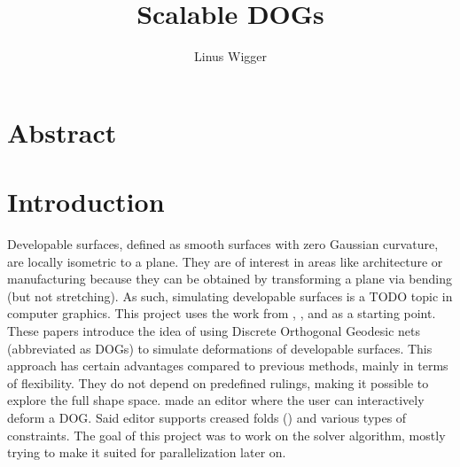 \documentclass[a4paper,twoside,12pt,nochapterprefix]{scrbook}
\title{Scalable DOGs}
\author{Linus Wigger}
\begin{document}
\maketitle

\chapter{Abstract}\label{sec:abstract}
\chapter{Introduction}\label{sec:intro}\label{sec:prev_work}
Developable surfaces, defined as smooth surfaces with zero Gaussian curvature, are locally isometric to a plane. They are of interest in areas like architecture or manufacturing because they can be obtained by transforming a plane via bending (but not stretching). As such, simulating developable surfaces is a TODO topic in computer graphics.\newline
This project uses the work from \cite{Rabinovich:DogNets:2018}, \cite{Rabinovich:DogShapeSpace:2018}, and \cite{Rabinovich:CurvedFolds:2019} as a starting point. These papers introduce the idea of using Discrete Orthogonal Geodesic nets (abbreviated as DOGs) to simulate deformations of developable surfaces.
 This approach has certain advantages compared to previous methods, mainly in terms of flexibility. They do not depend on predefined rulings, making it possible to explore the full shape space.\newline %
\cite{Rabinovich:DogNets:2018} made an editor where the user can interactively deform a DOG. Said editor supports creased folds (\cite{Rabinovich:CurvedFolds:2019}) and various types of constraints. The goal of this project was to work on the solver algorithm, mostly trying to make it suited for parallelization later on.\newline

\end{document}
